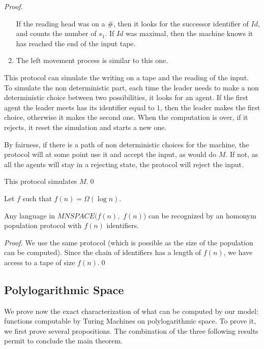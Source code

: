 \documentclass[UKenglish]{llncs}
\begin{document}
\begin{proof}
\begin{enumerate}
If the reading head was on a \#, then it looks for the successor identifier of $Id$, and counts the number of $s_1$.
If $Id$ was maximal, then the machine knows it has reached the end of the input tape.

\item The left movement process is similar to this one.
\end{enumerate}

This protocol can simulate the writing on a tape and the reading of the input.\\

To simulate the non deterministic
part, each time the leader needs to make a non deterministic choice
between two possibilities, it looks for an agent. If the first
agent the leader meets has its identifier equal to $1$, then the leader makes
the first choice, otherwise it makes the second one.
When the computation is over, if it rejects, it reset the simulation
and starts a new one.

By fairness, if there is a path of non deterministic choices for the machine,
the protocol will at some point use it and accept the input, as would do $M$.
If not, as all the agents will stay in a rejecting state, the protocol will reject
the input.

This protocol simulates $M$.\hfill \qed

\end{proof}

\begin{corollary}
Let $f$ such that $f(n)=\Omega(\log n)$. 

Any language in $MNSPACE(f(n),$ $f(n))$ can be recognized by an homonym population protocol with $f(n)$ identifiers.
\end{corollary}
\begin{proof}
We use the same protocol (which is possible as the size of the population can be computed).
Since the chain of identifiers has a length of $f(n)$, we have access to a tape of size $f(n)$.\hfill \qed

\end{proof}

\subsection{Polylogarithmic Space}

We prove now the exact characterization of what can be computed
by our model: functions computable by Turing Machines on
polylogarithmic space. To prove it, we first prove several propositions.
The combination of the three following results permit to conclude the main theorem.
\end{document}
